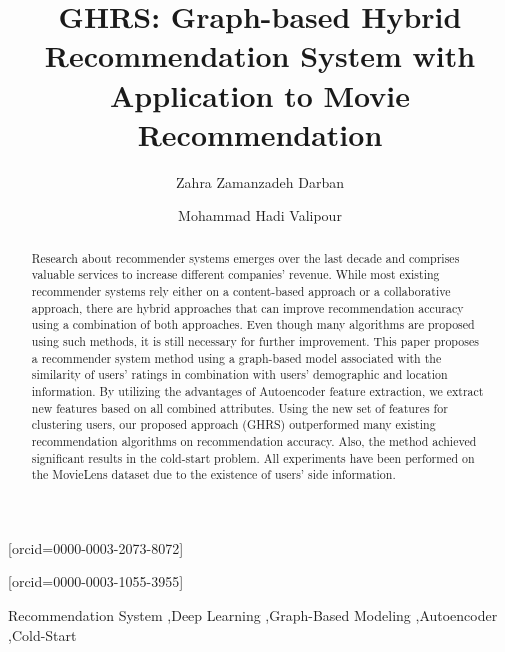 \documentclass[a4paper,fleqn]{cas-dc}
\begin{document}
\let\WriteBookmarks\relax
\def\floatpagepagefraction{1}
\def\textpagefraction{.001}


\title [mode = title]{GHRS: Graph-based Hybrid Recommendation System with Application to Movie Recommendation}


\author[1]{Zahra Zamanzadeh Darban}[orcid=0000-0003-2073-8072]
\cormark[1]



\address[1]{Faculty of Information Technology, Monash University, Melbourne, Australia}

\author[2]{Mohammad Hadi Valipour}[orcid=0000-0003-1055-3955]



\address[2]{Department of Engineering and Product, Ostadkar Company, Tehran, Iran}



\begin{abstract}
Research about recommender systems emerges over the last decade and comprises valuable services to increase different companies' revenue. While most existing recommender systems rely either on a content-based approach or a collaborative approach, there are hybrid approaches that can improve recommendation accuracy using a combination of both approaches. Even though many algorithms are proposed using such methods, it is still necessary for further improvement. This paper proposes a recommender system method using a graph-based model associated with the similarity of users' ratings in combination with users' demographic and location information. By utilizing the advantages of Autoencoder feature extraction, we extract new features based on all combined attributes. Using the new set of features for clustering users, our proposed approach (GHRS) outperformed many existing recommendation algorithms on recommendation accuracy. Also, the method achieved significant results in the cold-start problem. All experiments have been performed on the MovieLens dataset due to the existence of users' side information.

\end{abstract}



\begin{keywords}
	Recommendation System \sep Deep Learning \sep Graph-Based Modeling \sep Autoencoder \sep Cold-Start
\end{keywords}
\end{document}
